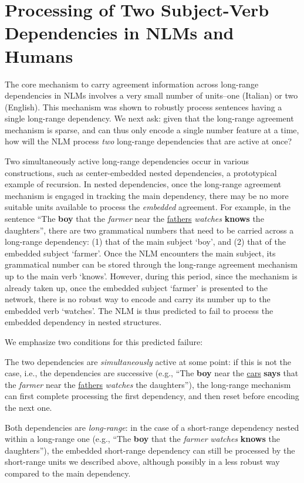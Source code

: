 \section{Processing of Two Subject-Verb Dependencies in NLMs and Humans}
The core mechanism to carry agreement information across long-range dependencies in NLMs involves a very small number of units--one (Italian) or two (English). This mechanism was shown to robustly process sentences having a single long-range dependency. We next ask: given that the long-range agreement mechanism is sparse, and can thus only encode a single number feature at a time, how will the NLM process \emph{two} long-range dependencies that are active at once?

Two simultaneously active long-range dependencies occur in various constructions, such as center-embedded nested dependencies, a prototypical example of recursion. In nested dependencies, once the long-range agreement mechanism is engaged in tracking the main dependency, there may be no more suitable units available to process the \textit{embedded} agreement. For example, in the sentence ``The \textbf{boy} that the \textit{farmer} near the \underline{fathers} \textit{watches} \textbf{knows} the daughters'', there are two grammatical numbers that need to be carried across a long-range dependency: (1) that of the main subject `boy', and (2) that of the embedded subject `farmer'. Once the NLM  encounters the main subject, its grammatical number can be stored through the long-range agreement mechanism up to the main verb `knows'. However, during this period, since the mechanism is already taken up, once the embedded subject `farmer' is presented to the network, there is no robust way to encode and carry its number up to the embedded verb `watches'. The NLM is thus predicted to fail to process the embedded dependency in nested structures.

We emphasize two conditions for this predicted failure:
\begin{APAitemize}
	\item The two dependencies are \textit{simultaneously} active at some point: if this is not the case, i.e., the dependencies are successive (e.g., ``The \textbf{boy} near the \underline{cars} \textbf{says} that the \textit{farmer} near the \underline{fathers} \textit{watches} the daughters''), the long-range mechanism can first complete processing the first dependency, and then reset before encoding the next one. 

    \item Both dependencies are \textit{long-range}: in the case
          of a short-range dependency nested within a long-range one
          (e.g., ``The \textbf{boy} that the \textit{farmer}
          \textit{watches} \textbf{knows} the daughters''), the
          embedded short-range dependency can still be processed by
          the short-range units we described above, although possibly in a less robust way compared to the main dependency. 
\end{APAitemize}

